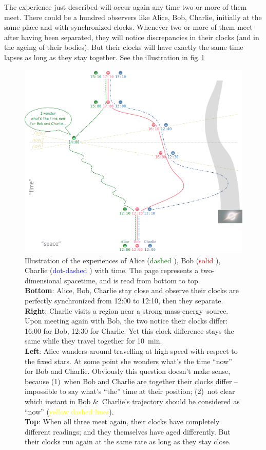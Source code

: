 \documentclass[a4paper,12pt,%
onecolumn,oneside,%
british%
]{memoir}
\newcommand*{\amp}{\&}
\renewcommand*{\|}[1][]{\nonscript\:#1\vert\nonscript\:\mathopen{}}
\newcommand*{\fig}{fig.}%
\newcommand*{\masse}{mass-energy}
\begin{document}
The experience just described will occur again any time two or more of them meet. There could be a hundred observers like Alice, Bob, Charlie, initially at the same place and with synchronized clocks. Whenever two or more of them meet after having been separated, they will notice discrepancies in their clocks (and in the ageing of their bodies). But their clocks will have exactly the same time lapses as long as they stay together. See the illustration in \fig\,\ref{fig:ABC_spacetime}

\begin{figure}[p]
  \includegraphics[width=\linewidth]{images/ABC_spacetime.png}
  \caption{Illustration of the experiences of Alice (\textcolor{green}{dashed }), Bob (\textcolor{red}{solid }), Charlie (\textcolor{blue}{dot-dashed }) with time. The page represents a two-dimensional spacetime, and is read from bottom to top.
\\\textbf{Bottom}: Alice, Bob, Charlie stay close and observe their clocks are perfectly synchronized from 12:00 to 12:10, then they separate.
\\\textbf{Right}: Charlie visits a region near a strong \masse\ source. Upon meeting again with Bob, the two notice their clocks differ: 16:00 for Bob, 12:30 for Charlie. Yet this clock difference stays the same while they travel together for \qty{10}{min}.
\\\textbf{Left}: Alice wanders around travelling at high speed with respect to the fixed stars. At some point she wonders what's the time \enquote{now} for Bob and Charlie. Obviously this question doesn't make sense, because
(1)~when Bob and Charlie are together their clocks differ -- impossible to say what's \enquote{the} time at their position; (2)~not clear which instant in Bob \amp\ Charlie's trajectory should be considered as \enquote{now} (\textcolor{yellow}{yellow dashed lines}).
\\\textbf{Top}: When all three meet again, their clocks have completely different readings; and they themselves have aged differently. But their clocks run again at the same rate as long as they stay close.}  \label{fig:ABC_spacetime}
\end{figure}
\end{document}
